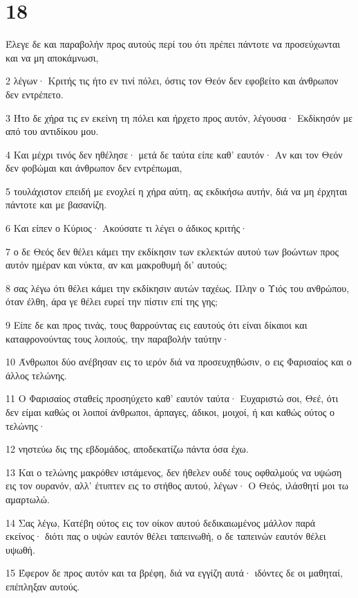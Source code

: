 \chapter{18}

\par Έλεγε δε και παραβολήν προς αυτούς περί του ότι πρέπει πάντοτε να προσεύχωνται και να μη αποκάμνωσι,
\par 2 λέγων· Κριτής τις ήτο εν τινί πόλει, όστις τον Θεόν δεν εφοβείτο και άνθρωπον δεν εντρέπετο.
\par 3 Ήτο δε χήρα τις εν εκείνη τη πόλει και ήρχετο προς αυτόν, λέγουσα· Εκδίκησόν με από του αντιδίκου μου.
\par 4 Και μέχρι τινός δεν ηθέλησε· μετά δε ταύτα είπε καθ' εαυτόν· Αν και τον Θεόν δεν φοβώμαι και άνθρωπον δεν εντρέπωμαι,
\par 5 τουλάχιστον επειδή με ενοχλεί η χήρα αύτη, ας εκδικήσω αυτήν, διά να μη έρχηται πάντοτε και με βασανίζη.
\par 6 Και είπεν ο Κύριος· Ακούσατε τι λέγει ο άδικος κριτής·
\par 7 ο δε Θεός δεν θέλει κάμει την εκδίκησιν των εκλεκτών αυτού των βοώντων προς αυτόν ημέραν και νύκτα, αν και μακροθυμή δι' αυτούς;
\par 8 σας λέγω ότι θέλει κάμει την εκδίκησιν αυτών ταχέως. Πλην ο Υιός του ανθρώπου, όταν έλθη, άρα γε θέλει ευρεί την πίστιν επί της γης;
\par 9 Είπε δε και προς τινάς, τους θαρρούντας εις εαυτούς ότι είναι δίκαιοι και καταφρονούντας τους λοιπούς, την παραβολήν ταύτην·
\par 10 Άνθρωποι δύο ανέβησαν εις το ιερόν διά να προσευχηθώσιν, ο εις Φαρισαίος και ο άλλος τελώνης.
\par 11 Ο Φαρισαίος σταθείς προσηύχετο καθ' εαυτόν ταύτα· Ευχαριστώ σοι, Θεέ, ότι δεν είμαι καθώς οι λοιποί άνθρωποι, άρπαγες, άδικοι, μοιχοί, ή και καθώς ούτος ο τελώνης·
\par 12 νηστεύω δις της εβδομάδος, αποδεκατίζω πάντα όσα έχω.
\par 13 Και ο τελώνης μακρόθεν ιστάμενος, δεν ήθελεν ουδέ τους οφθαλμούς να υψώση εις τον ουρανόν, αλλ' έτυπτεν εις το στήθος αυτού, λέγων· Ο Θεός, ιλάσθητί μοι τω αμαρτωλώ.
\par 14 Σας λέγω, Κατέβη ούτος εις τον οίκον αυτού δεδικαιωμένος μάλλον παρά εκείνος· διότι πας ο υψών εαυτόν θέλει ταπεινωθή, ο δε ταπεινών εαυτόν θέλει υψωθή.
\par 15 Έφερον δε προς αυτόν και τα βρέφη, διά να εγγίζη αυτά· ιδόντες δε οι μαθηταί, επέπληξαν αυτούς.
